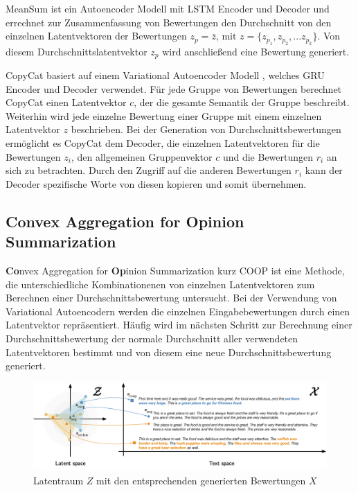 MeanSum ist ein Autoencoder Modell \citep{meansum} mit LSTM Encoder und Decoder und errechnet zur Zusammenfassung von Bewertungen den Durchschnitt von den einzelnen Latentvektoren der Bewertungen $z_p = \bar{z} \text{, mit } z=\{z_{p_1},z_{p_2},...z_{p_k}\}$.
Von diesem Durchschnittslatentvektor $z_p$ wird anschließend eine Bewertung generiert. 


CopyCat basiert auf einem Variational Autoencoder Modell \citep{copycat}, welches GRU Encoder und Decoder verwendet. 
Für jede Gruppe von Bewertungen berechnet CopyCat einen Latentvektor $c$, der die gesamte Semantik der Gruppe beschreibt. 
Weiterhin wird jede einzelne Bewertung einer Gruppe mit einem einzelnen Latentvektor $z$ beschrieben.
Bei der Generation von Durchschnittsbewertungen ermöglicht es CopyCat dem Decoder, die einzelnen Latentvektoren für die Bewertungen $z_i$, den allgemeinen Gruppenvektor $c$ und die Bewertungen $r_i$ an sich zu betrachten.
Durch den Zugriff auf die anderen Bewertungen $r_i$ kann der Decoder spezifische Worte von diesen \glqq kopieren\grqq{}  und somit übernehmen.



\subsection{Convex Aggregation for Opinion Summarization}
\label{coop}
\textbf{Co}nvex Aggregation for \textbf{Op}inion Summarization kurz COOP \citep{coop} ist eine Methode, die unterschiedliche Kombinationenen von einzelnen Latentvektoren zum Berechnen einer Durchschnittsbewertung untersucht.
Bei der Verwendung von Variational Autoencodern werden die einzelnen Eingabebewertungen durch einen Latentvektor repräsentiert. 
Häufig wird im nächsten Schritt zur Berechnung einer Durchschnittsbewertung der normale Durchschnitt aller verwendeten Latentvektoren bestimmt und von diesem eine neue Durchschnittsbewertung generiert.

\begin{figure}[h]
    \centering
    \includegraphics[width=\textwidth]{bilder/coop}
    \caption{Latentraum $Z$ mit den entsprechenden generierten Bewertungen $X$ \citep{coop}}
    \label{coop_fig}
\end{figure}

